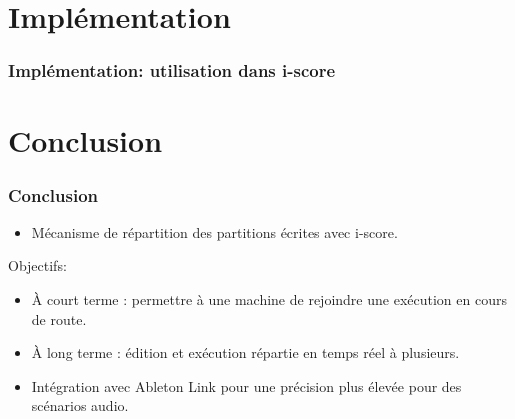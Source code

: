 \documentclass[]{beamer}
\begin{document}
\section{Implémentation}
\begin{frame}
\frametitle{Implémentation: utilisation dans i-score}
\end{frame}
\section{Conclusion}
\begin{frame}
    \frametitle{Conclusion}  
    \Large
    \begin{itemize}
        \item<1> Mécanisme de répartition des partitions écrites avec i-score.
    \end{itemize}

    Objectifs:
    \begin{itemize}
        \item<1> À court terme : permettre à une machine de rejoindre une exécution en cours de route.
        \item<2> À long terme : édition et exécution répartie en temps réel à plusieurs.
        \item<3> Intégration avec Ableton Link pour une précision plus élevée pour des scénarios audio.
    \end{itemize}
\end{frame}

\begin{frame}[allowframebreaks]%
    
    
    
    {\footnotesize
        \nocite{*}
        
        
    }
\end{frame}
\end{document}
